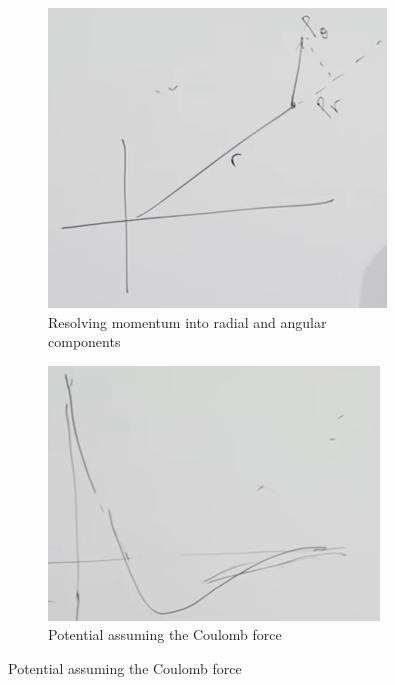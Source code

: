 \documentclass[]{article}
\begin{document}
\begin{figure}[H]
	\caption{Central Force as  a one dimensional problem}
	\begin{subfigure}[t]{0.3\textwidth}
		\caption{Resolving momentum into radial and angular components}\label{fig:aqm-3-1-momentum}
		\includegraphics[width=\textwidth]{aqm-3-1-momentum}
	\end{subfigure}
	\begin{subfigure}[t]{0.3\textwidth}
		\caption{Potential assuming the Coulomb force}\label{fig:aqm-3-central}
		\includegraphics[width=\textwidth]{aqm-3-central}

\end{subfigure}
\end{figure}
\end{document}
